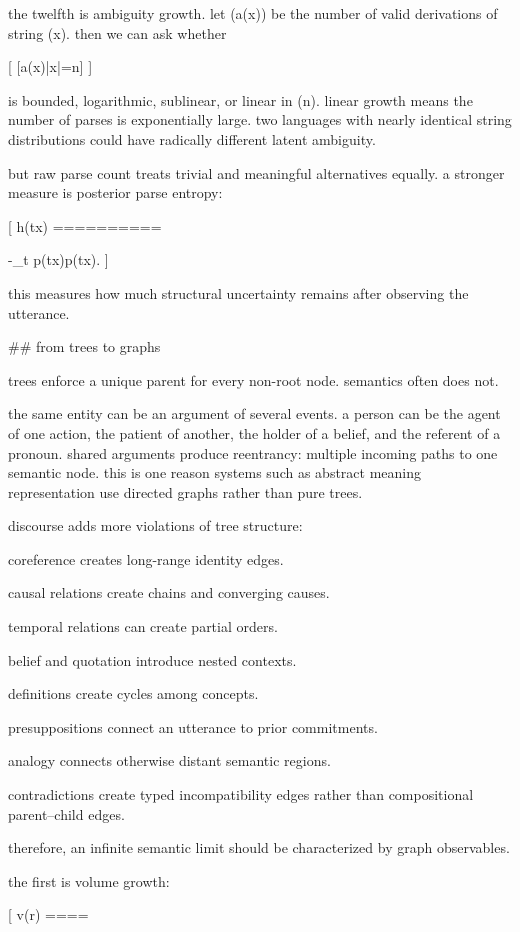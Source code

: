 the twelfth is ambiguity growth. let (a(x)) be the number of valid derivations of string (x). then we can ask whether

[
[\log a(x)\mid |x|=n]
]

is bounded, logarithmic, sublinear, or linear in (n). linear growth means the number of parses is exponentially large. two languages with nearly identical string distributions could have radically different latent ambiguity.

but raw parse count treats trivial and meaningful alternatives equally. a stronger measure is posterior parse entropy:

[
h(t\mid x)
==========

-\sum_t p(t\mid x)\log p(t\mid x).
]

this measures how much structural uncertainty remains after observing the utterance.

## from trees to graphs

trees enforce a unique parent for every non-root node. semantics often does not.

the same entity can be an argument of several events. a person can be the agent of one action, the patient of another, the holder of a belief, and the referent of a pronoun. shared arguments produce reentrancy: multiple incoming paths to one semantic node. this is one reason systems such as abstract meaning representation use directed graphs rather than pure trees.

discourse adds more violations of tree structure:

coreference creates long-range identity edges.

causal relations create chains and converging causes.

temporal relations can create partial orders.

belief and quotation introduce nested contexts.

definitions create cycles among concepts.

presuppositions connect an utterance to prior commitments.

analogy connects otherwise distant semantic regions.

contradictions create typed incompatibility edges rather than compositional parent–child edges.

therefore, an infinite semantic limit should be characterized by graph observables.

the first is volume growth:

[
v(r)
====

